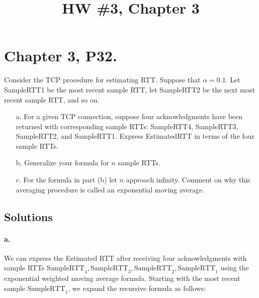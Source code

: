 \documentclass{cshwk}
\title{HW \#3, Chapter 3}
\begin{document}
\maketitle

\section*{Chapter 3, P32.}

Consider the TCP procedure for estimating RTT. Suppose that $\alpha = 0.1$. Let SampleRTT1 be the most recent sample RTT, let SampleRTT2 be the next most recent sample RTT, and so on.

\begin{enumerate}
    \item[a.] For a given TCP connection, suppose four acknowledgments have been returned with corresponding sample RTTs: SampleRTT4, SampleRTT3, SampleRTT2, and SampleRTT1. Express EstimatedRTT in terms of the four sample RTTs.
    \item[b.] Generalize your formula for $n$ sample RTTs.
    \item[c.] For the formula in part (b) let $n$ approach infinity. Comment on why this averaging procedure is called an exponential moving average.
\end{enumerate}

\subsection*{Solutions}

\paragraph{a.} We can express the Estimated RTT after receiving four acknowledgments with sample RTTs \(\text{SampleRTT}_4, \text{SampleRTT}_3, \text{SampleRTT}_2, \text{SampleRTT}_1\) using the exponential weighted moving average formula. Starting with the most recent sample \(\text{SampleRTT}_1\), we expand the recursive formula as follows:
\end{document}
